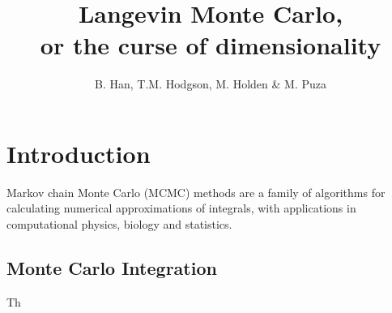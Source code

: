 \documentclass[a4paper]{article}
\title{Langevin Monte Carlo, \\
  \large or the curse of dimensionality}
\author{B. Han, T.M. Hodgson, M. Holden \& M. Puza}
\theoremstyle{definition}
\begin{document}
	\maketitle 

	\section{Introduction}
	Markov chain Monte Carlo (MCMC) methods are a family of algorithms for calculating numerical approximations of integrals, with applications in computational physics, biology and statistics.  
	
	\subsection*{Monte Carlo Integration}
	Th
		
	
	


		
		
		
\end{document}
